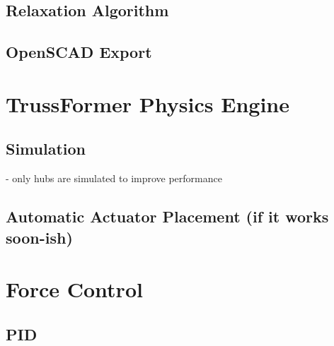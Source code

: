 \subsection{Relaxation Algorithm}\label{relaxation}

\subsection{OpenSCAD Export}\label{sec:openscad_impl}

\section{TrussFormer Physics Engine}

\subsection{Simulation}
- only hubs are simulated to improve performance

\subsection{Automatic Actuator Placement (if it works soon-ish)}

\section{Force Control}

\subsection{PID}
